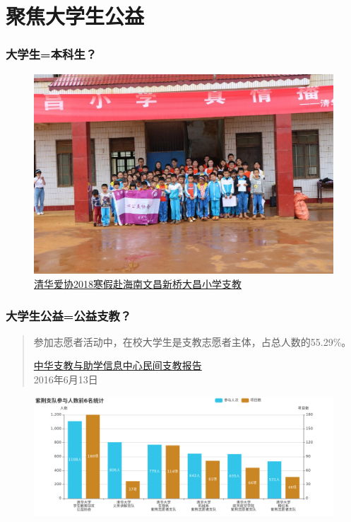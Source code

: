 \documentclass{ctexbeamer}
\begin{document}
\section{聚焦大学生公益} %
\begin{frame}
\frametitle{大学生=本科生？}
\begin{figure}
\includegraphics[width=\textwidth]{student1.jpg}
\caption{\href{http://leidenschaft.cn/volunteer0/}{清华爱协2018寒假赴海南文昌新桥大昌小学支教}}
\end{figure}
\end{frame}
\begin{frame}
\frametitle{大学生公益=公益支教？}
\begin{quote}
参加志愿者活动中，在校大学生是支教志愿者主体，占总人数的55.29\%。
\begin{flushright}
\href{http://www.cta613.org/thread-9282-1-1.html}{中华支教与助学信息中心民间支教报告}\\2016年6月13日
\end{flushright}
\end{quote}
\begin{figure}
\includegraphics[width=\textwidth]{student2.png}
\end{figure}
\end{frame}
\end{document}

